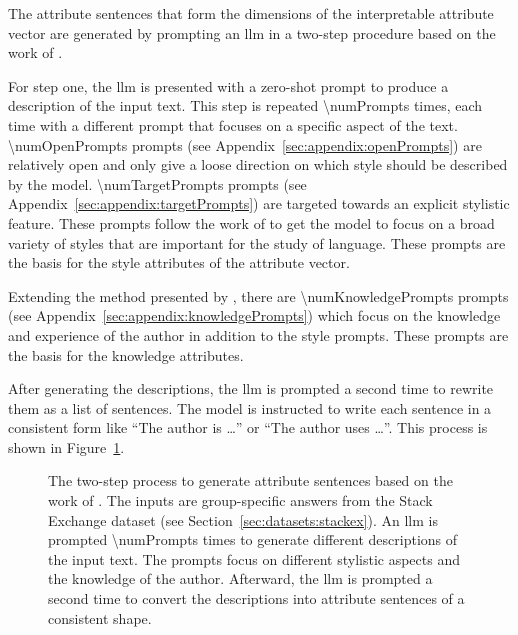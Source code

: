 The attribute sentences that form the dimensions of the interpretable attribute vector are generated by prompting an \acf{llm} in a two-step procedure based on the work of \citet{patelLearningInterpretableStyle2023}.

For step one, the \ac{llm} is presented with a zero-shot prompt to produce a description of the input text. This step is repeated \num{\numPrompts} times, each time with a different prompt that focuses on a specific aspect of the text. \num{\numOpenPrompts} prompts (see Appendix~\ref{sec:appendix:openPrompts}) are relatively open and only give a loose direction on which style should be described by the model. \num{\numTargetPrompts} prompts (see Appendix~\ref{sec:appendix:targetPrompts}) are targeted towards an explicit stylistic feature. These prompts follow the work of \citet{patelLearningInterpretableStyle2023,tausczikPsychologicalMeaningWords2010} to get the model to focus on a broad variety of styles that are important for the study of language. These prompts are the basis for the style attributes of the attribute vector.

Extending the method presented by \cite{patelLearningInterpretableStyle2023}, there are \num{\numKnowledgePrompts} prompts (see Appendix~\ref{sec:appendix:knowledgePrompts}) which focus on the knowledge and experience of the author in addition to the style prompts. These prompts are the basis for the knowledge attributes.

After generating the descriptions, the \ac{llm} is prompted a second time to rewrite them as a list of sentences. The model is instructed to write each sentence in a consistent form like \enquote{The author is \ldots} or \enquote{The author uses \ldots}. This process is shown in Figure~\ref{fig:attributeSentenceGeneration}.

\begin{figure}[ht]
  
  \caption{The two-step process to generate attribute sentences based on the work of \citet{patelLearningInterpretableStyle2023}. The inputs are group-specific answers from the Stack Exchange dataset (see Section~\ref{sec:datasets:stackex}). An \acs{llm} is prompted \num{\numPrompts} times to generate different descriptions of the input text. The prompts focus on different stylistic aspects and the knowledge of the author. Afterward, the \acs{llm} is prompted a second time to convert the descriptions into attribute sentences of a consistent shape.}
  \label{fig:attributeSentenceGeneration}
\end{figure}

